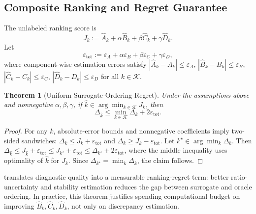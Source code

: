 \documentclass{article} %
\newtheorem{theorem}{Theorem}[section]
\begin{document}
\subsection{Composite Ranking and Regret Guarantee}
The unlabeled ranking score is
\begin{equation}
J_k := \widehat{A}_k + \alpha\widehat{B}_k + \beta\widehat{C}_k + \gamma\widehat{D}_k.
\label{eq:surrogate-score}
\end{equation}
Let
\begin{equation}
\varepsilon_{\mathrm{tot}} := \varepsilon_A + \alpha\varepsilon_B + \beta\varepsilon_C + \gamma\varepsilon_D,
\label{eq:eps-tot}
\end{equation}
where component-wise estimation errors satisfy
\(|\widehat{A}_k-A_k|\le\varepsilon_A\),
\(|\widehat{B}_k-B_k|\le\varepsilon_B\),
\(|\widehat{C}_k-C_k|\le\varepsilon_C\),
\(|\widehat{D}_k-D_k|\le\varepsilon_D\)
for all \(k\in\mathcal{K}\).

\begin{theorem}[Uniform Surrogate-Ordering Regret]
\label{thm:ordering}
Under the assumptions above and nonnegative \(\alpha,\beta,\gamma\), if \(\hat k\in\arg\min_{k\in\mathcal{K}} J_k\), then
\begin{equation}
\Delta_{\hat k} \le \min_{k\in\mathcal{K}}\Delta_k + 2\varepsilon_{\mathrm{tot}}.
\label{eq:ordering-bound}
\end{equation}
\end{theorem}

\begin{proof}
For any \(k\), absolute-error bounds and nonnegative coefficients imply two-sided sandwiches:
\(\Delta_k\le J_k+\varepsilon_{\mathrm{tot}}\) and
\(\Delta_k\ge J_k-\varepsilon_{\mathrm{tot}}\).
Let \(k^\star\in\arg\min_k\Delta_k\). Then
\(\Delta_{\hat k}\le J_{\hat k}+\varepsilon_{\mathrm{tot}}\le J_{k^\star}+\varepsilon_{\mathrm{tot}}\le \Delta_{k^\star}+2\varepsilon_{\mathrm{tot}}\),
where the middle inequality uses optimality of \(\hat k\) for \(J_k\). Since \(\Delta_{k^\star}=\min_k\Delta_k\), the claim follows.
\end{proof}

 translates diagnostic quality into a measurable ranking-regret term: better ratio-uncertainty and stability estimation reduces the gap between surrogate and oracle ordering. In practice, this theorem justifies spending computational budget on improving \(\widehat{B}_k,\widehat{C}_k,\widehat{D}_k\), not only on discrepancy estimation.
\end{document}
